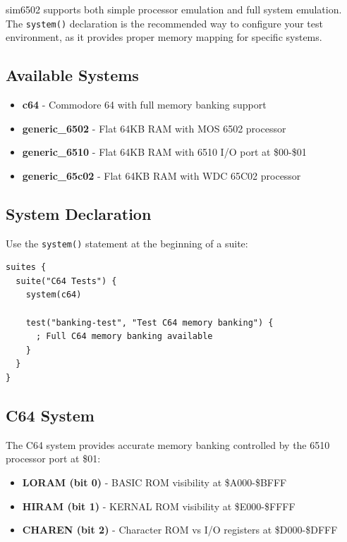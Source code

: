 \documentclass[11pt,letterpaper]{article}
\begin{document}
sim6502 supports both simple processor emulation and full system emulation. The \texttt{system()} declaration is the recommended way to configure your test environment, as it provides proper memory mapping for specific systems.

\subsection{Available Systems}

\begin{itemize}
    \item \textbf{c64} - Commodore 64 with full memory banking support
    \item \textbf{generic\_6502} - Flat 64KB RAM with MOS 6502 processor
    \item \textbf{generic\_6510} - Flat 64KB RAM with 6510 I/O port at \$00-\$01
    \item \textbf{generic\_65c02} - Flat 64KB RAM with WDC 65C02 processor
\end{itemize}

\subsection{System Declaration}

Use the \texttt{system()} statement at the beginning of a suite:

\begin{verbatim}
suites {
  suite("C64 Tests") {
    system(c64)

    test("banking-test", "Test C64 memory banking") {
      ; Full C64 memory banking available
    }
  }
}
\end{verbatim}

\subsection{C64 System}

The C64 system provides accurate memory banking controlled by the 6510 processor port at \$01:

\begin{itemize}
    \item \textbf{LORAM (bit 0)} - BASIC ROM visibility at \$A000-\$BFFF
    \item \textbf{HIRAM (bit 1)} - KERNAL ROM visibility at \$E000-\$FFFF
    \item \textbf{CHAREN (bit 2)} - Character ROM vs I/O registers at \$D000-\$DFFF
\end{itemize}
\end{document}

